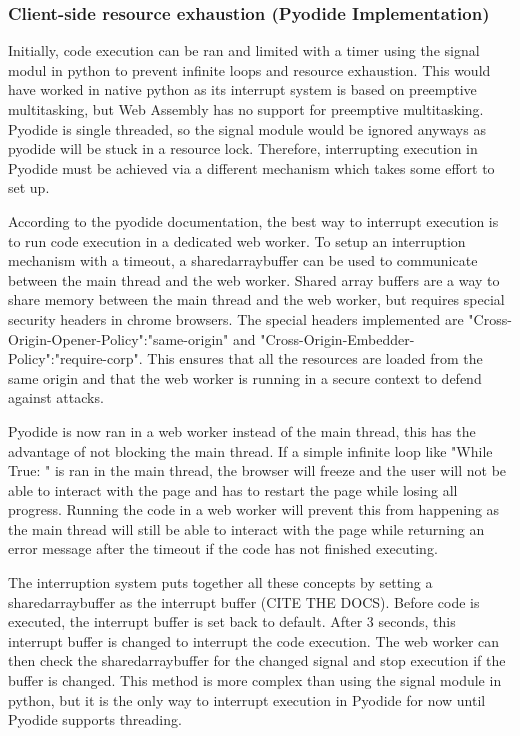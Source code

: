 \subsubsection{Client-side resource exhaustion (Pyodide Implementation)}
Initially, code execution can be ran and limited with a timer using the signal modul in python to prevent infinite loops and resource exhaustion. This would have worked in native python as its interrupt system is based on preemptive multitasking, but Web Assembly has no support for preemptive multitasking. Pyodide is single threaded, so the signal module would be ignored anyways as pyodide will be stuck in a resource lock. Therefore, interrupting execution in Pyodide must be achieved via a different mechanism which takes some effort to set up.

According to the pyodide documentation, the best way to interrupt execution is to run code execution in a dedicated web worker. To setup an interruption mechanism with a timeout, a sharedarraybuffer can be used to communicate between the main thread and the web worker. Shared array buffers are a way to share memory between the main thread and the web worker, but requires special security headers in chrome browsers. The special headers implemented are  "Cross-Origin-Opener-Policy":"same-origin" and "Cross-Origin-Embedder-Policy":"require-corp". This ensures that all the resources are loaded from the same origin and that the web worker is running in a secure context to defend against attacks.

Pyodide is now ran in a web worker instead of the main thread, this has the advantage of not blocking the main thread. If a simple infinite loop like "While True: " is ran in the main thread, the browser will freeze and the user will not be able to interact with the page and has to restart the page while losing all progress. Running the code in a web worker will prevent this from happening as the main thread will still be able to interact with the page while returning an error message after the timeout if the code has not finished executing.

The interruption system puts together all these concepts by setting a sharedarraybuffer as the interrupt buffer (CITE THE DOCS). Before code is executed, the interrupt buffer is set back to default. After 3 seconds, this interrupt buffer is changed to interrupt the code execution. The web worker can then check the sharedarraybuffer for the changed signal and stop execution if the buffer is changed. This method is more complex than using the signal module in python, but it is the only way to interrupt execution in Pyodide for now until Pyodide supports threading. 

